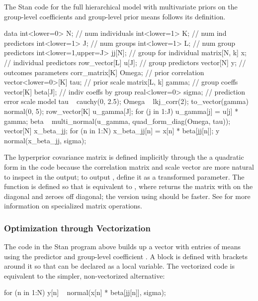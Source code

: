 The Stan code for the full hierarchical model with multivariate priors
on the group-level coefficients and group-level prior means follows
its definition.
%
\begin{stancode}
data {
  int<lower=0> N;              // num individuals
  int<lower=1> K;              // num ind predictors
  int<lower=1> J;              // num groups
  int<lower=1> L;              // num group predictors
  int<lower=1,upper=J> jj[N];  // group for individual
  matrix[N, k] x;               // individual predictors
  row_vector[L] u[J];          // group predictors
  vector[N] y;                 // outcomes
}
parameters {
  corr_matrix[K] Omega;        // prior correlation
  vector<lower=0>[K] tau;      // prior scale
  matrix[L, k] gamma;           // group coeffs
  vector[K] beta[J];           // indiv coeffs by group
  real<lower=0> sigma;         // prediction error scale
}
model {
  tau ~ cauchy(0, 2.5);
  Omega ~ lkj_corr(2);
  to_vector(gamma) ~ normal(0, 5);
  {
    row_vector[K] u_gamma[J];
    for (j in 1:J)
      u_gamma[j] = u[j] * gamma;
    beta ~ multi_normal(u_gamma, quad_form_diag(Omega, tau));
  }
  {
    vector[N] x_beta_jj;
    for (n in 1:N)
      x_beta_jj[n] = x[n] * beta[jj[n]];
    y ~ normal(x_beta_jj, sigma);
  }
}
\end{stancode}
%
The hyperprior covariance matrix is defined implicitly through the
a quadratic form in the code 
because the correlation matrix  and scale vector
 are more natural to inspect in the output; to output
, define it as a transformed parameter.  The function
 is defined so that
 is equivalent to
, where
 returns the matrix with  on the
diagonal and zeroes off diagonal; the version using
 should be faster.  See
 for more information on
specialized matrix operations.

\subsubsection{Optimization through Vectorization}

The code in the Stan program above builds up a vector with entries
 of means using the predictor  and
group-level coefficient .  A block is defined with
brackets around it so that  can be declared as a
local variable.  The vectorized code is equivalent to the simpler,
non-vectorized alternative:
%
\begin{stancode}
  for (n in 1:N)
    y[n] ~ normal(x[n] * beta[jj[n]], sigma);
\end{stancode}
%


